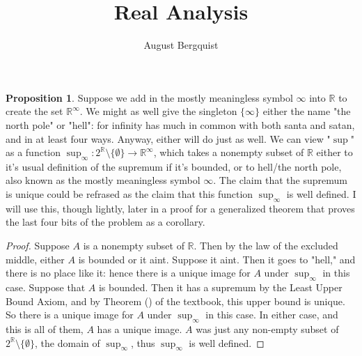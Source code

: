 \documentclass[11pt]{article}
\title{Real Analysis}
\author{August Bergquist}
\newcommand{\R}{\mathbb{R}}
\theoremstyle{definition}
\newtheorem{proposition}{Proposition}
\begin{document}
\maketitle

\begin{proposition} Suppose we add in the mostly meaningless symbol $\infty$ into $\R$ to create the set $\R^\infty$. We might as well give the singleton $\{\infty\}$ either the name "the north pole" or "hell": for infinity has much in common with both santa and satan, and in at least four ways. Anyway, either will do just as well. We can view "$\sup$" as a function $\sup_\infty:2^\R\setminus \{\emptyset\} \to \R^\infty$, which takes a nonempty subset of $\R$ either to it's usual definition of the supremum if it's bounded, or to hell/the north pole, also known as the mostly meaningless symbol $\infty$. The claim that the supremum is unique could be refrased as the claim that this function $\sup_\infty$ is well defined. I will use this, though lightly, later in a proof for a generalized theorem that proves the last four bits of the problem as a corollary.
\end{proposition}
\begin{proof}
Suppose $A$ is a nonempty subset of $\R$. Then by the law of the excluded middle, either $A$ is bounded or it aint. Suppose it aint. Then it goes to "hell," and there is no place like it: hence there is a unique image for $A$ under $\sup_\infty$ in this case. Suppose that $A$ is bounded. Then it has a supremum by the Least Upper Bound Axiom, and by Theorem () of the textbook, this upper bound is unique. So there is a unique image for $A$ under $\sup_\infty$ in this case. In either case, and this is all of them, $A$ has a unique image. $A$ was just any non-empty subset of $2^\R\setminus \{\emptyset\}$, the domain of $\sup_\infty$, thus $\sup_\infty$ is well defined.
\end{proof}
\end{document}
